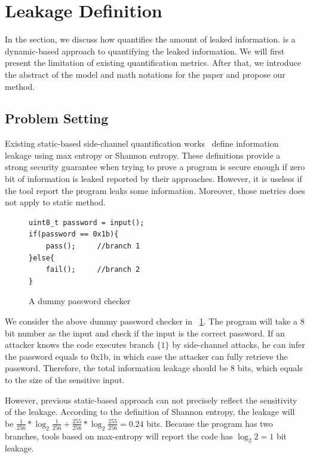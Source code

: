 \section{\tool{} Leakage Definition}
\label{trace_qif}
In the section, we discuss how \tool{} quantifies the amount of
leaked information. \tool{} is a dynamic-based approach to 
quantifying the leaked information. We will first present 
the limitation of existing quantification metrics. After
that, we introduce the abstract of the model and math notations 
for the paper and propose our method.

\subsection{Problem Setting}
Existing static-based side-channel quantification works~\cite{182946,Wichelmann:2018:MFF:3274694.3274741 } define information leakage
using max entropy or Shannon entropy. These definitions provide a strong security guarantee
when trying to prove a program is secure enough if zero bit of information is leaked 
reported by their approaches. However, it is useless if the tool report the program leaks
some information. Moreover, those metrics does not apply to static method.


\begin{figure}[h!]
    \centering
\begin{lstlisting}[xleftmargin=.03\textwidth,xrightmargin=.01\textwidth]
uint8_t password = input();
if(password == 0x1b){
    pass();     //branch 1
}else{
    fail();     //branch 2
}
\end{lstlisting}
\caption{A dummy password checker}
\label{figure:password checker}
\end{figure}

We consider the above dummy password checker in ~\ref{figure:password checker}.
The program will take a 8 bit number as the input and check if the input is the
correct password. 
If an attacker knows the
code executes branch $\{{1\}}$ by side-channel attacks, he can infer the password equals to 0x1b,
in which case the attacker can fully retrieve the password.
Therefore, the total information leakage should be 8 bits, which equals to the size
of the sensitive input. 

However, previous static-based approach can not precisely reflect the sensitivity of the leakage.
According to the definition of Shannon entropy, the leakage will be $\frac{1}{256}*\log_{2}\frac{1}{256} + 
\frac{255}{256} *\log_{2}\frac{255}{256}= 0.24$ bits. Because the program has two branches, tools
based on max-entropy will report the code has $\log_2{2} = 1$ bit leakage.

